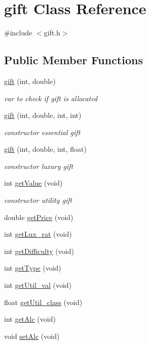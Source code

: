 \hypertarget{classgift}{}\section{gift Class Reference}
\label{classgift}


{\ttfamily \#include $<$gift.\+h$>$}

\subsection*{Public Member Functions}
\begin{DoxyCompactItemize}
\item 
\hyperlink{classgift_a782f5cf6316f6c76061b72cc12c6d95c}{gift} (int, double)
\begin{DoxyCompactList}\small\item\em var to check if gift is allocated \end{DoxyCompactList}\item 
\hyperlink{classgift_a1de4cec7237a45096900754354d1edb6}{gift} (int, double, int, int)
\begin{DoxyCompactList}\small\item\em constructor essential gift \end{DoxyCompactList}\item 
\hyperlink{classgift_ac62aba6ac2db2845c7b60a5496b6de75}{gift} (int, double, int, float)
\begin{DoxyCompactList}\small\item\em constructor luxury gift \end{DoxyCompactList}\item 
int \hyperlink{classgift_a75432abfdbeec0b8880f4f3d265d41a6}{get\+Value} (void)
\begin{DoxyCompactList}\small\item\em constructor utility gift \end{DoxyCompactList}\item 
double \hyperlink{classgift_afb3ea488ce0a02ae622c1acf5608bc94}{get\+Price} (void)
\item 
int \hyperlink{classgift_a680a1bc8854391b628a36faa9568f790}{get\+Lux\+\_\+rat} (void)
\item 
int \hyperlink{classgift_a677b7f1368eef76f344b3a623fdea915}{get\+Difficulty} (void)
\item 
int \hyperlink{classgift_a820ca25bbee4873ef9b0e82ca2f73ad3}{get\+Type} (void)
\item 
int \hyperlink{classgift_a5e2d84e4d1fe8c00903a71195fc41487}{get\+Util\+\_\+val} (void)
\item 
float \hyperlink{classgift_a2bb6e0ed9bb5c1f98d47660d39ebf3f8}{get\+Util\+\_\+class} (void)
\item 
int \hyperlink{classgift_a35e47e5084f539114e84b7ce477d93e2}{get\+Alc} (void)
\item 
void \hyperlink{classgift_a312e5d347516d8ea351e1127de8a28ce}{set\+Alc} (void)
\end{DoxyCompactItemize}


